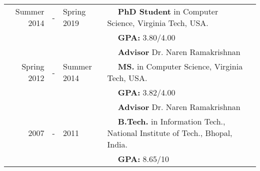 
  \tabcolsep=0.11cm
  \begin{tabular}{rclll}
    Summer 2014 & - & Spring 2019 & $\quad$ {\bf PhD Student} in Computer Science, Virginia Tech, USA. \\
                & & & $\quad$ \textbf{GPA:} 3.80/4.00\\
                & & & $\quad$ \textbf{Advisor} Dr. Naren Ramakrishnan \\
    Spring 2012 & - & Summer 2014 & $\quad$ {\bf MS.} in Computer
    Science, Virginia Tech, USA.\\
                & & & $\quad$ \textbf{GPA:} 3.82/4.00\\
                & & & $\quad$ \textbf{Advisor} Dr. Naren Ramakrishnan \\

    2007 & - & 2011 & $\quad$ {\bf B.Tech.} in Information Tech.,
    National Institute of Tech., Bhopal, India. \\
        & & & $\quad$ \textbf{GPA:} 8.65/10\\
  \end{tabular}


